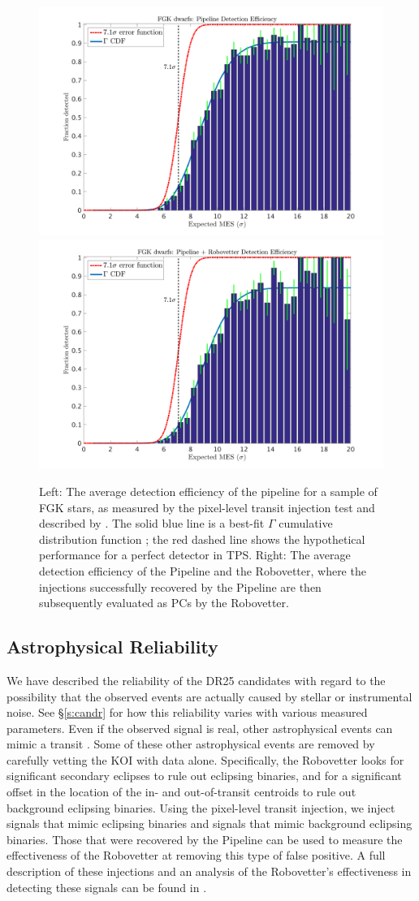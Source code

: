 \begin{figure}[ht]

\centering

\includegraphics[width=0.45\linewidth]{fig-senscurvwithfits_withoutRv.png}
\includegraphics[width=0.45\linewidth]{fig-senscurvwithfits_withRv.png}

\caption{Left: The average detection efficiency of the pipeline for a sample of FGK stars, as measured by the pixel-level transit injection test and described by \citet{Christiansen2017}. The solid blue line is a best-fit $\Gamma$ cumulative distribution function \citep[see equation 1 of ][]{Christiansen2016}; the red dashed line shows the hypothetical performance for a perfect detector in TPS. Right: The average detection efficiency of the \Kepler{} Pipeline and the Robovetter, where the injections successfully recovered by the Pipeline are then subsequently evaluated as PCs by the Robovetter.}

\label{f:fulldetectionefficiency}

\end{figure}


\subsection{Astrophysical Reliability}
We have described the reliability of the DR25 candidates with regard to the possibility that the observed events are actually caused by stellar or instrumental noise. See \S\ref{s:candr} for how this reliability varies with various measured parameters.  Even if the observed signal is real, other astrophysical events can mimic a transit \citep[see e.g.][]{Morton2016}. Some of these other astrophysical events are removed by carefully vetting the KOI with \Kepler{} data alone.  Specifically, the Robovetter looks for significant secondary eclipses to rule out eclipsing binaries, and for a significant offset in the location of the in- and out-of-transit centroids to rule out background eclipsing binaries. Using the pixel-level transit injection, we inject signals that mimic eclipsing binaries and signals that mimic background eclipsing binaries. Those that were recovered by the \Kepler{} Pipeline can be used to measure the effectiveness of the Robovetter at removing this type of false positive. A full description of these injections and an analysis of the Robovetter's effectiveness in detecting these signals can be found in \citet{Coughlin2017a}.

